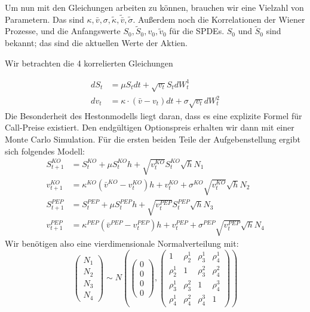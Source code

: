 \documentclass[12pt]{article}
\begin{document}
Um nun mit den Gleichungen arbeiten zu können, brauchen wir eine Vielzahl von Parametern. Das sind $\kappa, \bar{v}, \sigma, \tilde{\kappa}, \tilde{\bar{v}}, \tilde{\sigma}$. Außerdem noch die Korrelationen der Wiener Prozesse, und die Anfangswerte $S_0, \tilde{S}_0, v_0, \tilde{v}_0$ für die SPDEs. $S_0$ und $\tilde{S}_0$ sind bekannt; das sind die aktuellen Werte der Aktien.

Wir betrachten die 4 korrelierten Gleichungen

\begin{align*} \label{SPDE}
dS_t &= \mu S_t dt + \sqrt{v_t} S_t dW^1_t \\
dv_t &= \kappa\cdot(\bar{v}-v_t) dt + \sigma \sqrt{v_t}dW^2_t 
\end{align*}
 Die Besonderheit des Hestonmodells liegt daran, dass es eine explizite Formel für Call-Preise existiert. Den endgültigen Optionspreis erhalten wir dann mit einer Monte Carlo Simulation. Für die ersten beiden Teile der Aufgebenstellung ergibt sich folgendes Modell:
\begin{align*}
S^{KO}_{t+1}&=S^{KO}_{t}+\mu S^{KO}_{t}h+\sqrt{v^{KO}_t}S^{KO}_{t}\sqrt{h}N_1\\
v^{KO}_{t+1}&=\kappa^{KO}(\bar{v}^{KO}-v^{KO}_t)h+v^{KO}_t+\sigma^{KO}\sqrt{v^{KO}_t}\sqrt{h}N_2\\
S^{PEP}_{t+1}&=S^{PEP}_{t}+\mu S^{PEP}_{t}h+\sqrt{v^{PEP}_t}S^{PEP}_{t}\sqrt{h}N_3\\
v^{PEP}_{t+1}&=\kappa^{PEP}(\bar{v}^{PEP}-v^{PEP}_t)h+v^{PEP}_t+\sigma^{PEP}\sqrt{v^{PEP}_t}\sqrt{h}N_4
\end{align*}
Wir benötigen also eine vierdimensionale Normalverteilung mit:
\begin{equation*}
\left({\begin{array}{c} N_1\\ N_2\\ N_3\\ N_4\end{array}}\right) \sim N\left(\left({\begin{array}{c} 0 \\ 0 \\ 0 \\ 0 \end{array}}\right),\left({\begin{array}{cccc} 1 & \rho^1_2 & \rho^1_3 & \rho^1_4\\ \rho^1_2 & 1 & \rho^2_3 & \rho^2_4 \\ \rho^1_3 & \rho^2_3 & 1 & \rho^3_4 \\ \rho^1_4 & \rho^2_4 & \rho^3_4 & 1 \end{array}}\right)\right)
\end{equation*}
\end{document}
